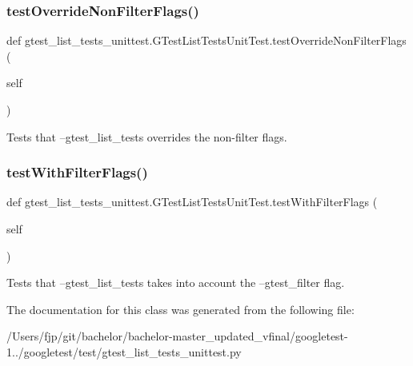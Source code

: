\subsubsection{\texorpdfstring{test\+Override\+Non\+Filter\+Flags()}{testOverrideNonFilterFlags()}}
{\footnotesize\ttfamily def gtest\+\_\+list\+\_\+tests\+\_\+unittest.\+G\+Test\+List\+Tests\+Unit\+Test.\+test\+Override\+Non\+Filter\+Flags (\begin{DoxyParamCaption}\item[{}]{self }\end{DoxyParamCaption})}

\begin{DoxyVerb}Tests that --gtest_list_tests overrides the non-filter flags.\end{DoxyVerb}
 \mbox{\label{classgtest__list__tests__unittest_1_1_g_test_list_tests_unit_test_ac5bef6c9fb78b8eef84427de811fd70f}} 
\subsubsection{\texorpdfstring{test\+With\+Filter\+Flags()}{testWithFilterFlags()}}
{\footnotesize\ttfamily def gtest\+\_\+list\+\_\+tests\+\_\+unittest.\+G\+Test\+List\+Tests\+Unit\+Test.\+test\+With\+Filter\+Flags (\begin{DoxyParamCaption}\item[{}]{self }\end{DoxyParamCaption})}

\begin{DoxyVerb}Tests that --gtest_list_tests takes into account the
--gtest_filter flag.\end{DoxyVerb}
 

The documentation for this class was generated from the following file\+:\begin{DoxyCompactItemize}
\item 
/\+Users/fjp/git/bachelor/bachelor-\/master\+\_\+updated\+\_\+vfinal/googletest-\/1../googletest/test/gtest\+\_\+list\+\_\+tests\+\_\+unittest.\+py\end{DoxyCompactItemize}
